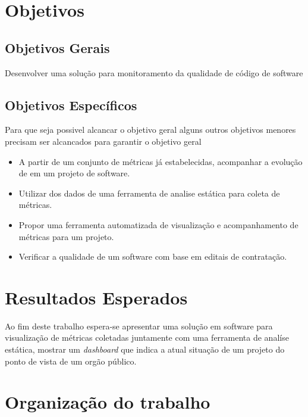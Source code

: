 	\section{Objetivos}

	\subsection{Objetivos Gerais} %
	\label{sub:objetivos_gerais}
	
		Desenvolver uma solução para monitoramento da qualidade de código de software


	\subsection{Objetivos Específicos} %
	\label{sub:objetivos_específicos}

	Para que seja possivel alcancar o objetivo geral alguns outros objetivos menores precisam ser alcancados para garantir  o objetivo geral 
		 
	\begin{itemize}
		\item A partir de um conjunto de métricas já estabelecidas, acompanhar a evolução de em um projeto de software.
		\item Utilizar dos dados de uma ferramenta de analise estática para coleta de métricas.  
		\item Propor uma ferramenta automatizada de visualização e acompanhamento de métricas para um projeto.
		\item Verificar a qualidade de um software com base em editais de contratação. 
	\end{itemize}
	
	
	\section{Resultados Esperados}

Ao fim deste trabalho espera-se apresentar uma solução em software para visualização de métricas coletadas  juntamente com uma ferramenta de analíse estática, mostrar um \textit{dashboard} que indica a atual situação de um projeto do ponto de vista de um orgão público. 

	\section{Organização do trabalho} %
	\label{sec:organização_do_trabalho} 	
